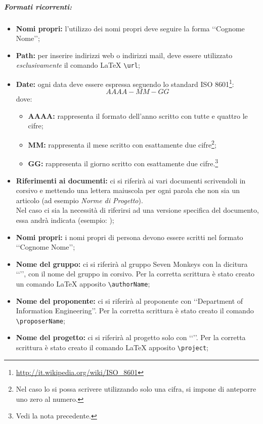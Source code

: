 \subparagraph{Formati ricorrenti:}
\label{fricorrenti}
\begin{itemize}
\item \textbf{Nomi propri:} l'utilizzo dei nomi propri deve seguire la forma \lq\lq{}Cognome Nome\rq\rq{};
\item \textbf{Path:} per inserire indirizzi web o indirizzi mail, deve essere utilizzato \emph{esclusivamente} il comando \LaTeX{} \verb!\url!;
\item \textbf{Date:} ogni data deve essere espressa seguendo lo standard ISO 8601\footnote{\url{http://it.wikipedia.org/wiki/ISO_8601}}: 
\begin{displaymath}
	AAAA-MM-GG
\end{displaymath}
dove:
\begin{itemize}
\item \textbf{AAAA:} rappresenta il formato dell'anno scritto con tutte e quattro le cifre;
\item \textbf{MM:} rappresenta il mese scritto con esattamente due cifre\footnote{Nel caso lo si possa scrivere utilizzando solo una cifra, si impone di anteporre uno zero al numero.};
\item \textbf{GG:} rappresenta il giorno scritto con esattamente due cifre.\footnote{Vedi la nota precedente.}
\end{itemize}
\item \textbf{Riferimenti ai documenti:} ci si riferirà ai vari documenti scrivendoli in corsivo e mettendo una lettera maiuscola per ogni parola che non sia un articolo (ad esempio \emph{Norme di Progetto}). 
\\Nel caso ci sia la necessità di riferirsi ad una versione specifica del documento, essa andrà indicata (esempio: \NdP{});
\item \textbf{Nomi propri:} i nomi propri di persona devono essere scritti nel formato \lq\lq{}Cognome Nome\rq\rq{};
\item \textbf{Nome del gruppo:} ci si riferirà al gruppo Seven Monkeys con la dicitura \lq\lq{}\authorName{}\rq\rq{}, con il nome del gruppo in corsivo. Per la corretta scrittura è stato creato un comando \LaTeX{} apposito \verb!\authorName!;
\item \textbf{Nome del proponente:} ci si riferirà al proponente con \lq\lq{}Department of Information Engineering\rq\rq{}. Per la corretta scrittura è stato creato il comando \verb!\proposerName!;
\item \textbf{Nome del progetto:} ci si riferirà al progetto solo con \lq\lq{}\project\rq\rq{}. Per la corretta scrittura è stato creato il comando \LaTeX{} apposito \verb!\project!;

\end{itemize}
